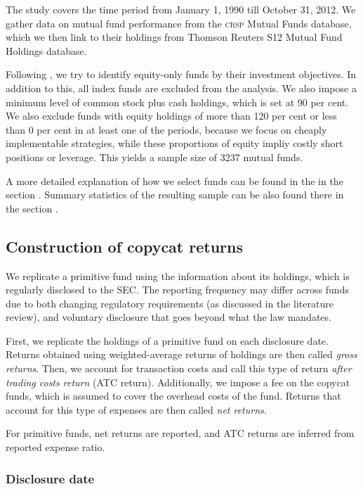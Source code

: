 \documentclass[12pt, a4]{article}
\begin{document}
The study covers the time period from January 1, 1990 till October 31, 2012. We gather data on mutual fund performance from the \textsc{crsp} Mutual Funds database, which we then link to their holdings from Thomson Reuters S12 Mutual Fund Holdings database.

Following \cite{verbeek}, we try to identify equity-only funds by their investment objectives. In addition to this, all index funds are excluded from the analysis. We also impose a minimum level of common stock plus cash holdings, which is set at 90 per cent. We also exclude funds with equity holdings of more than 120 per cent or less than 0 per cent in at least one of the periods, because we focus on cheaply implementable strategies, while these proportions of equity impliy costly short positions or leverage. This yields a sample size of 3237 mutual funds.

A more detailed explanation of how we select funds can be found in the  in the section . Summary statistics of the resulting sample can be also found there in the section .

\subsection{Construction of copycat returns}

We replicate a primitive fund using the information about its holdings, which is regularly disclosed to the \textsc{SEC}. The reporting frequency may differ across funds due to both changing regulatory requirements (as discussed in the literature review), and voluntary disclosure that goes beyond what the law mandates. 

First, we replicate the holdings of a primitive fund on each disclosure date. Returns obtained using weighted-average returns of holdings are then called \textit{gross returns}. Then, we account for transaction costs and call this type of return \textit{after trading costs return} (\textsc{ATC} return). Additionally, we impose a fee on the copycat funds, which is assumed to cover the overhead costs of the fund. Returns that account for this type of expenses are then called \textit{net returns}.

For primitive funds, net returns are reported, and \textsc{ATC} returns are inferred from reported expense ratio.

\subsubsection{Disclosure date}
\end{document}
